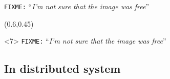 \documentclass{beamer}
\newcommand{\fixme}[1]{\texttt{\color{red}FIXME:} ``\emph{#1}''}
\begin{document}
\begin{frame}
\begin{textblock*}{50mm}
\begin{exampleblock}{}
              \small{\fixme{I'm not sure that the image was free}}
        \end{exampleblock}
    \end{textblock*}
    \begin{textblock*}{50mm}(0.6\textwidth,0.45\textheight)
        \begin{exampleblock}{}<7>
              \small{\fixme{I'm not sure that the image was free}}
        \end{exampleblock}
    \end{textblock*}
\end{frame}

\subsection{In distributed system}
\end{document}

